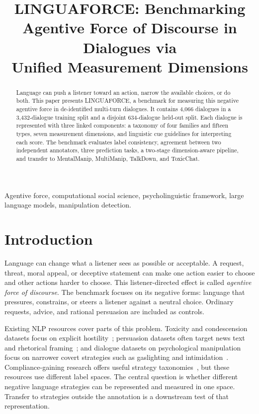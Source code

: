 \documentclass[conference]{IEEEtran}
\newcommand{\AFD}{Agentive Force of Discourse}
\newcommand{\afd}{agentive force of discourse}
\newcommand{\LNGF}{LINGUAFORCE}
\begin{document}
\title{\LNGF{}: Benchmarking \AFD{} in Dialogues via\\ Unified Measurement Dimensions}

\author{
}

\maketitle

\begin{abstract}
Language can push a listener toward an action, narrow the available choices,
or do both. This paper presents \LNGF{}, a benchmark for measuring this
negative agentive force in de-identified multi-turn dialogues. It contains
4{,}066 dialogues in a 3{,}432-dialogue training split and a disjoint
634-dialogue held-out split. Each dialogue is represented with three linked
components:
a taxonomy of four families and fifteen types, seven measurement dimensions,
and linguistic cue guidelines for interpreting each score. The benchmark evaluates label consistency,
agreement between two independent annotators, three prediction tasks, a
two-stage dimension-aware pipeline, and transfer to MentalManip, MultiManip,
TalkDown, and ToxicChat.
\end{abstract}


\begin{IEEEkeywords}
Agentive force, computational social science, psycholinguistic framework,
large language models, manipulation detection.
\end{IEEEkeywords}
\section{Introduction}
Language can change what a listener sees as possible or acceptable. A request,
threat, moral appeal, or deceptive statement can make one action easier to
choose and other actions harder to choose. This listener-directed effect is
called \emph{\afd{}}. The benchmark focuses on its negative forms: language that
pressures, constrains, or steers a listener against a neutral choice. Ordinary
requests, advice, and rational persuasion are included as controls.

Existing NLP resources cover parts of this problem. Toxicity and
condescension datasets focus on explicit hostility~\cite{toxicchat2023,
talkdown2023}; persuasion datasets often target news text and rhetorical
framing~\cite{piskorski2023}; and dialogue datasets on psychological
manipulation focus on narrower covert strategies such as gaslighting and
intimidation~\cite{mentalmanip,multimanip,reament}. Compliance-gaining
research offers useful strategy taxonomies~\cite{marwell1967,wiseman1981,
cialdini1984}, but these resources use different label spaces. The central
question is whether different negative language strategies can be represented
and measured in one space. Transfer to strategies outside the annotation is a
downstream test of that representation.
\end{document}
